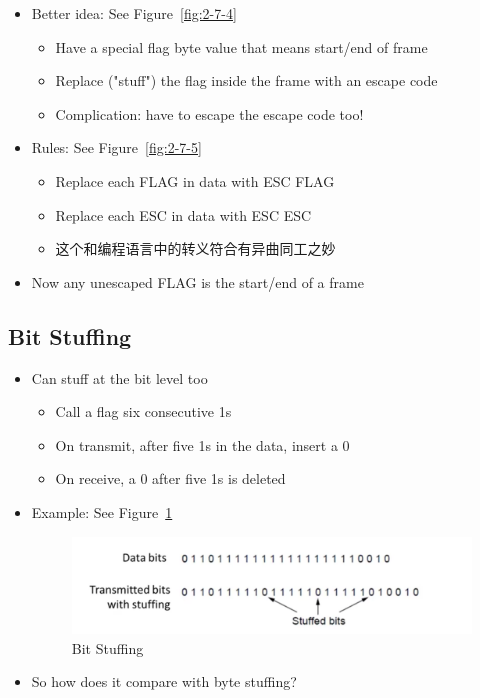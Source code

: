 \documentclass[12pt]{ctexart}   %
\begin{document}
	\begin{itemize}
		\item Better idea: See Figure~\ref{fig:2-7-4}
		\begin{itemize}
			\item Have a special flag byte value that means start/end of frame
			\item Replace ("stuff") the flag inside the frame with an escape code
			\item Complication: have to escape the escape code too!
		\end{itemize}
		
		\item Rules: See Figure~\ref{fig:2-7-5}
		\begin{itemize}
			\item Replace each FLAG in data with ESC FLAG
			\item Replace each ESC in data with ESC ESC
			\item 这个和编程语言中的转义符合有异曲同工之妙
		\end{itemize}
		
		\item Now any unescaped FLAG is the start/end of a frame
	\end{itemize}
	
	\subsection{Bit Stuffing}
	\begin{itemize}
		\item Can stuff at the bit level too
		\begin{itemize}
			\item Call a flag six consecutive 1s
			\item On transmit, after five 1s in the data, insert a 0
			\item On receive, a 0 after five 1s is deleted
		\end{itemize}
		
		\item Example:  See Figure~\ref{fig:2-7-6}
		\begin{figure}[h!] %
		\centering
		 \includegraphics[scale=0.7]{images/2-7-6}
		\caption{Bit Stuffing}
		 \label{fig:2-7-6}
		 \end{figure}
		 
		\item So how does it compare with byte stuffing? 
		
	\end{itemize}
	
\end{document}
